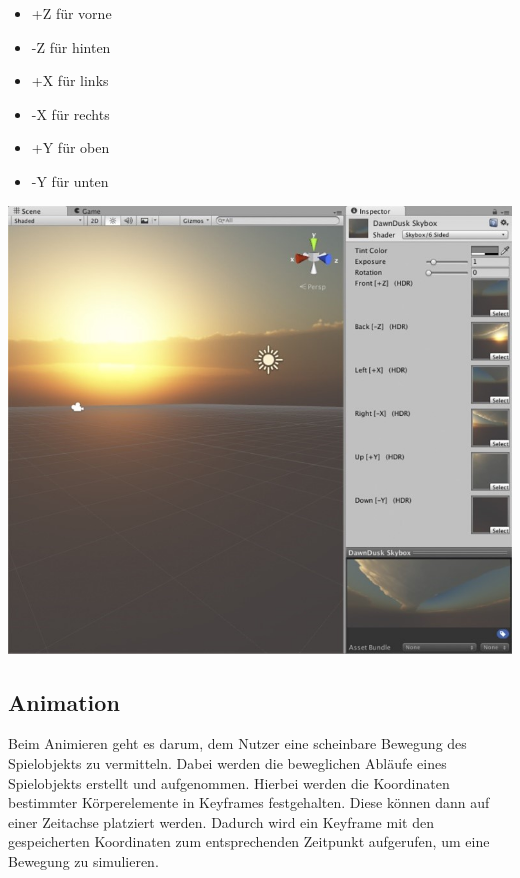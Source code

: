 \begin{minipage}{0.4\textwidth}
    \begin{itemize}
        \item +Z für vorne 
        \item -Z für hinten 
        \item +X für links 
        \item -X für rechts
        \item +Y für oben
        \item -Y für unten
    \end{itemize}
  \end{minipage}
  \hfill
  \begin{minipage}{0.6\textwidth}
    \includegraphics[width=\linewidth]{chapters/14/Images/Skybox.png}
  \end{minipage}

\pagebreak
\subsection{Animation}

Beim Animieren geht es darum, dem Nutzer eine scheinbare Bewegung des Spielobjekts zu vermitteln. Dabei werden die beweglichen Abläufe eines Spielobjekts erstellt und aufgenommen. Hierbei werden die Koordinaten bestimmter Körperelemente in Keyframes festgehalten. Diese können dann auf einer Zeitachse platziert werden. Dadurch wird ein Keyframe mit den gespeicherten Koordinaten zum entsprechenden Zeitpunkt aufgerufen, um eine Bewegung zu simulieren.